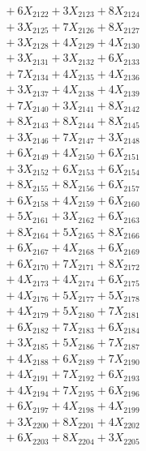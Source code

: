 \documentclass[a4paper,10pt]{article}
\begin{document}
{\begin{align}
&\;  + 6 X_{2122} + 3 X_{2123} + 8 X_{2124} \\[0.3ex]
&\;  + 3 X_{2125} + 7 X_{2126} + 8 X_{2127} \\[0.3ex]
&\;  + 3 X_{2128} + 4 X_{2129} + 4 X_{2130} \\[0.3ex]
&\;  + 3 X_{2131} + 3 X_{2132} + 6 X_{2133} \\[0.3ex]
&\;  + 7 X_{2134} + 4 X_{2135} + 4 X_{2136} \\[0.3ex]
&\;  + 3 X_{2137} + 4 X_{2138} + 4 X_{2139} \\[0.5ex]\allowbreak
&\;  + 7 X_{2140} + 3 X_{2141} + 8 X_{2142} \\[0.3ex]
&\;  + 8 X_{2143} + 8 X_{2144} + 8 X_{2145} \\[0.3ex]
&\;  + 3 X_{2146} + 7 X_{2147} + 3 X_{2148} \\[0.3ex]
&\;  + 6 X_{2149} + 4 X_{2150} + 6 X_{2151} \\[0.3ex]
&\;  + 3 X_{2152} + 6 X_{2153} + 6 X_{2154} \\[0.3ex]
&\;  + 8 X_{2155} + 8 X_{2156} + 6 X_{2157} \\[0.3ex]
&\;  + 6 X_{2158} + 4 X_{2159} + 6 X_{2160} \\[0.3ex]
&\;  + 5 X_{2161} + 3 X_{2162} + 6 X_{2163} \\[0.3ex]
&\;  + 8 X_{2164} + 5 X_{2165} + 8 X_{2166} \\[0.3ex]
&\;  + 6 X_{2167} + 4 X_{2168} + 6 X_{2169} \\[0.5ex]\allowbreak
&\;  + 6 X_{2170} + 7 X_{2171} + 8 X_{2172} \\[0.3ex]
&\;  + 4 X_{2173} + 4 X_{2174} + 6 X_{2175} \\[0.3ex]
&\;  + 4 X_{2176} + 5 X_{2177} + 5 X_{2178} \\[0.3ex]
&\;  + 4 X_{2179} + 5 X_{2180} + 7 X_{2181} \\[0.3ex]
&\;  + 6 X_{2182} + 7 X_{2183} + 6 X_{2184} \\[0.3ex]
&\;  + 3 X_{2185} + 5 X_{2186} + 7 X_{2187} \\[0.3ex]
&\;  + 4 X_{2188} + 6 X_{2189} + 7 X_{2190} \\[0.3ex]
&\;  + 4 X_{2191} + 7 X_{2192} + 6 X_{2193} \\[0.3ex]
&\;  + 4 X_{2194} + 7 X_{2195} + 6 X_{2196} \\[0.3ex]
&\;  + 6 X_{2197} + 4 X_{2198} + 4 X_{2199} \\[0.5ex]\allowbreak
&\;  + 3 X_{2200} + 8 X_{2201} + 4 X_{2202} \\[0.3ex]
&\;  + 6 X_{2203} + 8 X_{2204} + 3 X_{2205} \\[0.3ex]

\end{align}}
\end{document}
